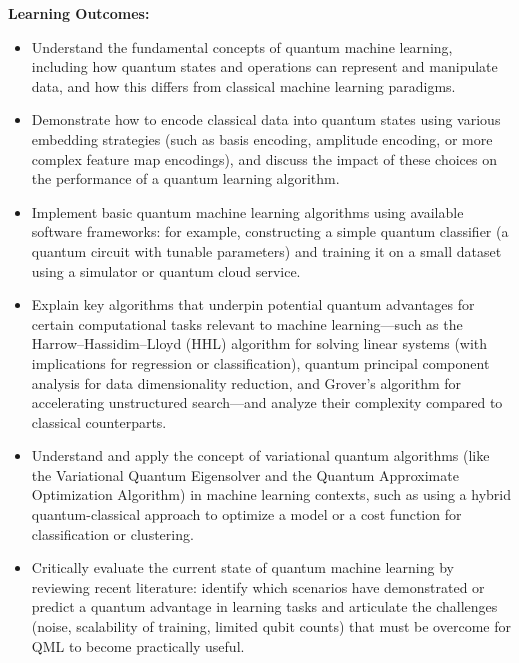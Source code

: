\documentclass{scrreprt}
\begin{document}
\textbf{Learning Outcomes:}
\begin{itemize}
\item Understand the fundamental concepts of quantum machine learning, including how quantum states and operations can represent and manipulate data, and how this differs from classical machine learning paradigms.
\item Demonstrate how to encode classical data into quantum states using various embedding strategies (such as basis encoding, amplitude encoding, or more complex feature map encodings), and discuss the impact of these choices on the performance of a quantum learning algorithm.
\item Implement basic quantum machine learning algorithms using available software frameworks: for example, constructing a simple quantum classifier (a quantum circuit with tunable parameters) and training it on a small dataset using a simulator or quantum cloud service.
\item Explain key algorithms that underpin potential quantum advantages for certain computational tasks relevant to machine learning—such as the Harrow–Hassidim–Lloyd (HHL) algorithm for solving linear systems (with implications for regression or classification), quantum principal component analysis for data dimensionality reduction, and Grover’s algorithm for accelerating unstructured search—and analyze their complexity compared to classical counterparts.
\item Understand and apply the concept of variational quantum algorithms (like the Variational Quantum Eigensolver and the Quantum Approximate Optimization Algorithm) in machine learning contexts, such as using a hybrid quantum-classical approach to optimize a model or a cost function for classification or clustering.
\item Critically evaluate the current state of quantum machine learning by reviewing recent literature: identify which scenarios have demonstrated or predict a quantum advantage in learning tasks and articulate the challenges (noise, scalability of training, limited qubit counts) that must be overcome for QML to become practically useful.
\end{itemize}
\end{document}
